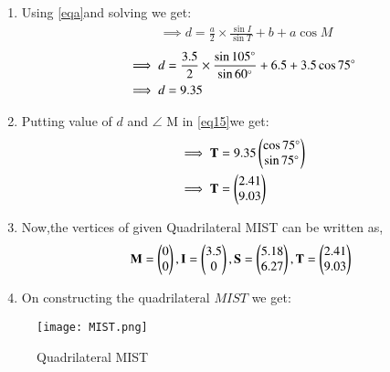 \documentclass[journal,12pt,twocolumn]{IEEEtran}
\begin{document}
\begin{enumerate}
\item Using \eqref{eqa}and solving we get:
\begin{align}
&\implies d=\frac{a}{2}\times\frac{\sin I}{\sin T}+ b+a \cos M 
\end{align}
\begin{align}
&\implies d=\frac{3.5}{2}\times\frac{\sin 105 \degree}{\sin 60 \degree}+ 6.5+3.5 \cos75 \degree
\\
&\implies d=9.35
\end{align}
\item Putting value of $d$  and $\angle$ M in \eqref{eq15}we get:
\begin{align}
&\implies \mathbf{T} =9.35\begin{pmatrix}\cos 75 \degree\\\sin 75 \degree\end{pmatrix}
\\
&\implies \mathbf{T}=\begin{pmatrix}2.41\\9.03\end{pmatrix} 
\end{align}
   \item Now,the vertices of given Quadrilateral MIST can be written as,
\begin{align}
 \mathbf{M}=\begin{pmatrix}0\\0\end{pmatrix},\mathbf{I} = \begin{pmatrix}3.5\\0\end{pmatrix}, \mathbf{S}=\begin{pmatrix}5.18\\6.27\end{pmatrix},\mathbf{T}=\begin{pmatrix}2.41\\9.03\end{pmatrix} 
\end{align}
    \item On constructing the quadrilateral $MIST$ we get:
\end{enumerate}


\begin{figure}[!ht]
\centering
\texttt{[image: MIST.png]}
\caption{Quadrilateral MIST}
\label{fig:Quadrilateral MIST}	
\end{figure}
\end{document}
